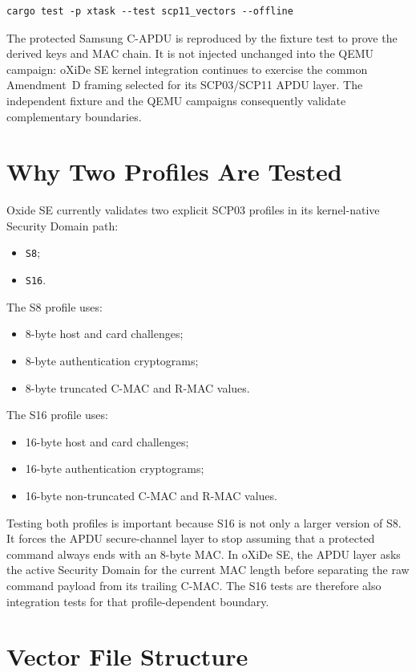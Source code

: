\begin{verbatim}
cargo test -p xtask --test scp11_vectors --offline
\end{verbatim}

The protected Samsung C-APDU is reproduced by the fixture test to prove the
derived keys and MAC chain. It is not injected unchanged into the QEMU
campaign: oXiDe SE kernel integration continues to exercise the common
Amendment~D framing selected for its SCP03/SCP11 APDU layer. The independent fixture
and the QEMU campaigns consequently validate complementary boundaries.

\section{Why Two Profiles Are Tested}

Oxide SE currently validates two explicit SCP03 profiles in its kernel-native
Security Domain path:
\begin{itemize}
\item \texttt{S8};
\item \texttt{S16}.
\end{itemize}

The S8 profile uses:
\begin{itemize}
\item 8-byte host and card challenges;
\item 8-byte authentication cryptograms;
\item 8-byte truncated C-MAC and R-MAC values.
\end{itemize}

The S16 profile uses:
\begin{itemize}
\item 16-byte host and card challenges;
\item 16-byte authentication cryptograms;
\item 16-byte non-truncated C-MAC and R-MAC values.
\end{itemize}

Testing both profiles is important because S16 is not only a larger version of
S8. It forces the APDU secure-channel layer to stop assuming that a protected
command always ends with an 8-byte MAC. In oXiDe SE, the APDU layer asks the
active Security Domain for the current MAC length before separating the raw
command payload from its trailing C-MAC. The S16 tests are therefore also
integration tests for that profile-dependent boundary.

\section{Vector File Structure}

